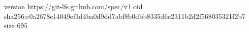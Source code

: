 version https://git-lfs.github.com/spec/v1
oid sha256:c0a2678e14049ef3d4ba0d9dd7abf8b0dbb8335d6e2311b2d2f568035321f2b7
size 695
